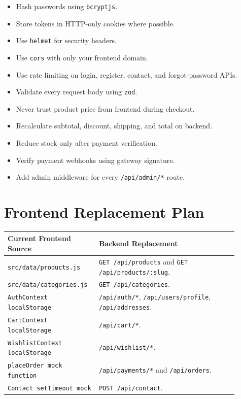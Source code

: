 \documentclass[11pt,a4paper]{article}
\begin{document}
\begin{itemize}
  \item Hash passwords using \texttt{bcryptjs}.
  \item Store tokens in HTTP-only cookies where possible.
  \item Use \texttt{helmet} for security headers.
  \item Use \texttt{cors} with only your frontend domain.
  \item Use rate limiting on login, register, contact, and forgot-password APIs.
  \item Validate every request body using \texttt{zod}.
  \item Never trust product price from frontend during checkout.
  \item Recalculate subtotal, discount, shipping, and total on backend.
  \item Reduce stock only after payment verification.
  \item Verify payment webhooks using gateway signature.
  \item Add admin middleware for every \texttt{/api/admin/*} route.
\end{itemize}

\section{Frontend Replacement Plan}

\begin{longtable}{p{0.32\linewidth} p{0.58\linewidth}}
\toprule
\textbf{Current Frontend Source} & \textbf{Backend Replacement} \\
\midrule
\texttt{src/data/products.js} & \texttt{GET /api/products} and \texttt{GET /api/products/:slug}. \\
\texttt{src/data/categories.js} & \texttt{GET /api/categories}. \\
\texttt{AuthContext localStorage} & \texttt{/api/auth/*}, \texttt{/api/users/profile}, \texttt{/api/addresses}. \\
\texttt{CartContext localStorage} & \texttt{/api/cart/*}. \\
\texttt{WishlistContext localStorage} & \texttt{/api/wishlist/*}. \\
\texttt{placeOrder mock function} & \texttt{/api/payments/*} and \texttt{/api/orders}. \\
\texttt{Contact setTimeout mock} & \texttt{POST /api/contact}. \\
\bottomrule
\end{longtable}
\end{document}

